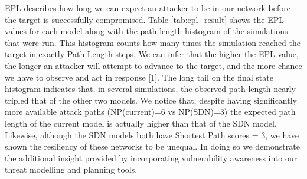 EPL describes how long we can expect an attacker to be in our network before the target is successfully compromised. Table \ref{tab:epl_result} shows the EPL values for each model along with the path length histogram of the simulations that were run. This histogram counts how many times the simulation reached the target in exactly Path Length steps. We can infer that the higher the EPL value, the longer an attacker will attempt to advance to the target, and the more chance we have to observe and act in response [1]. The long tail on the final state histogram indicates that, in several simulations, the observed path length nearly tripled that of the other two models. We notice that, despite having significantly more available attack paths (NP(current)=6 vs NP(SDN)=3) the expected path length of the current model is actually higher than that of the SDN model. Likewise, although the SDN models  both have Shortest Path scores = 3, we have shown the resiliency of these networks to be unequal.  In doing so we demonstrate the additional insight provided by incorporating vulnerability awareness into our threat modelling and planning tools.

